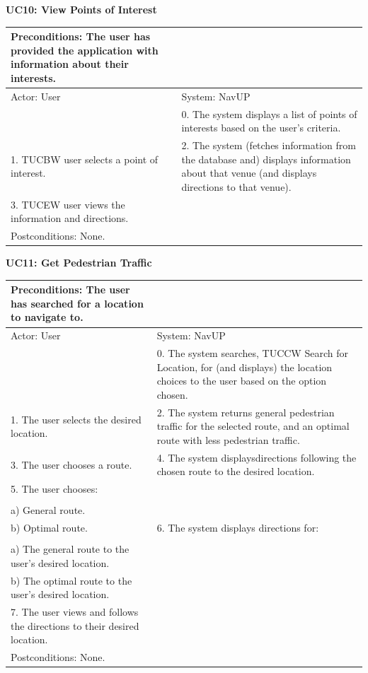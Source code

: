 \documentclass{article}
\begin{document}
		
        		\centering
					\textbf{UC10: View Points of Interest}\\
       		 \small
       		 \begin{tabular}{|p{8cm}|p{8cm}|}
       		 \hline
       		 Preconditions: The user has provided the application with information about their interests.& \\
       		 \hline
       		 Actor: User & System: NavUP \\
        		\hline
       		 & 0.	The system displays a list of points of interests based on the user's criteria.\\
       		 \hline
       		 1.	TUCBW user selects a point of interest. & 2.	The system (fetches information from the database and) displays information about that venue (and displays directions to that venue).\\
        		\hline
       		 3.	TUCEW user views the information and directions. &\\
       		 \hline
        		Postconditions: None.& \\
        		\hline
        \end{tabular} 
      

		
        		\centering
					\textbf{UC11: Get Pedestrian Traffic}\\
       		 \small
       		 \begin{tabular}{|p{8cm}|p{8cm}|}
       		 \hline
       		 Preconditions: The user has searched for a location to navigate to.& \\
       		 \hline
       		 Actor: User & System: NavUP \\
        		\hline
       		  & 0.	The system searches, TUCCW Search for Location, for (and displays) the location choices to the user based on the option chosen.\\
       		 \hline
       		 1.	The user selects the desired location. & 2.	The system returns general pedestrian traffic for the selected route, and an optimal route with less pedestrian traffic.\\
        		\hline
       		 3.	The user chooses a route. & 4.	The system displaysdirections following the chosen route to the desired location.\\
        		\hline
       		 5.	The user chooses:\\

						\\a)	General route.
					\\	b)	Optimal route.
			 & 6.	The system displays directions for:\\

					\\a)	The general route to the user's desired location.
					\\b)	The optimal route to the user's desired location.
 \\
        		\hline
        		7.	The user views and follows the directions to their desired location. & \\
       		 \hline
        		Postconditions: None.& \\
        		\hline
        \end{tabular} 
     
\end{document}
